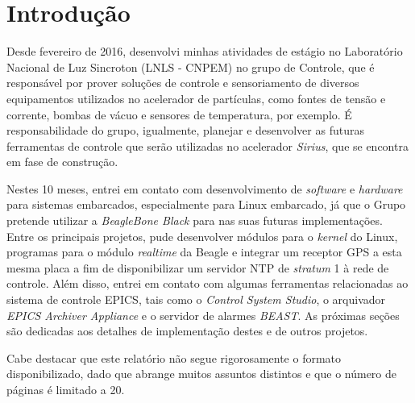 \section {Introdução}

Desde fevereiro de 2016, desenvolvi minhas atividades de
estágio no Laboratório Nacional de Luz Sincroton (LNLS - CNPEM) no grupo de Controle, que
é responsável por prover soluções de controle e sensoriamento de diversos
equipamentos utilizados no acelerador de partículas, como fontes de tensão e
corrente, bombas de vácuo e sensores de temperatura, por exemplo. É
responsabilidade do grupo, igualmente, planejar e desenvolver as futuras
ferramentas de controle que serão utilizadas no acelerador \textit{Sirius}, que
se encontra em fase de construção.

\vspace{12pt}

Nestes 10 meses, entrei em contato com desenvolvimento
de \textit{software} e \textit{hardware} para sistemas embarcados, especialmente
para Linux embarcado, já que o Grupo pretende utilizar a
\textit{BeagleBone Black} para nas suas futuras
implementações. Entre os principais projetos, pude desenvolver módulos para o
\textit{kernel} do Linux, programas para o módulo \textit{realtime} da Beagle e integrar um receptor GPS a esta
mesma placa a fim de disponibilizar um servidor NTP de \textit{stratum} 1 à
rede de controle. Além disso, entrei em contato com algumas ferramentas
relacionadas ao sistema de controle EPICS, tais como o
\textit{Control System Studio}, o arquivador \textit{EPICS Archiver Appliance}
e o servidor de alarmes \textit{BEAST}. As próximas seções são dedicadas aos
detalhes de implementação destes e de outros projetos.

\vspace{12pt}

Cabe destacar que este relatório não segue rigorosamente o formato
disponibilizado, dado que abrange muitos assuntos distintos e que o número de
páginas é limitado a 20.

\newpage
